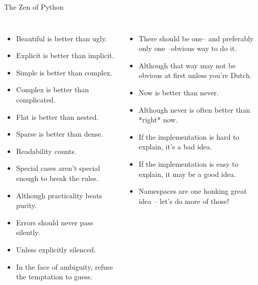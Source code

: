 \documentclass[9pt]{beamer}
\begin{document}
\begin{frame}{The Zen of Python}
  \begin{columns}[onlytextwidth]
      \begin{itemize}
        \item Beautiful is better than ugly.
        \item Explicit is better than implicit.
        \item Simple is better than complex.
        \item Complex is better than complicated.
        \item Flat is better than nested.
        \item Sparse is better than dense.
        \item Readability counts.
        \item Special cases aren't special enough to break the rules.
        \item Although practicality beats purity.
        \item Errors should never pass silently.
        \item Unless explicitly silenced.
        \item In the face of ambiguity, refuse the temptation to guess.
      \end{itemize}
      \begin{itemize}
        \item There should be one-- and preferably only one --obvious way to do it.
        \item Although that way may not be obvious at first unless you're Dutch.
        \item Now is better than never.
        \item Although never is often better than *right* now.
        \item If the implementation is hard to explain, it's a bad idea.
        \item If the implementation is easy to explain, it may be a good idea.
        \item Namespaces are one honking great idea -- let's do more of those!
      \end{itemize}
  \end{columns}
\end{frame}
\end{document}
